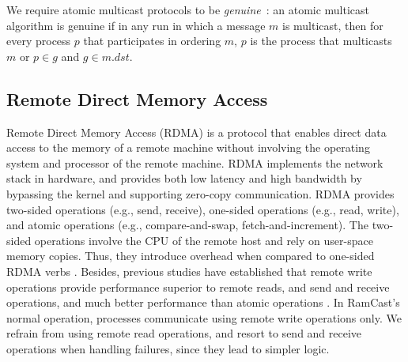 We require atomic multicast protocols to be \emph{genuine}~\cite{GS01b}: 
an atomic multicast algorithm is genuine if in any run in which a message $m$ is 
multicast, then for every process $p$ that participates in ordering $m$, $p$ is the process that multicasts $m$ or $p \in g$ and $g \in m.dst$.

\subsection{Remote Direct Memory Access}
\label{sec:rdma}

Remote Direct Memory Access (RDMA) is a protocol that enables direct data access to the memory of a remote machine without involving the operating system and processor of the remote machine. 
RDMA implements the network stack in hardware, and provides both low latency and high bandwidth by bypassing the kernel and supporting zero-copy communication.
RDMA provides two-sided operations (e.g., send, receive), one-sided operations (e.g., read, write), and atomic operations (e.g., compare-and-swap, fetch-and-increment). The two-sided operations involve the CPU of the remote host and rely on user-space memory copies.
Thus, they introduce overhead when compared to one-sided RDMA verbs \cite{FaRM}.
Besides, previous studies have established that remote write operations provide performance superior to remote reads, and send and receive operations, and much better performance than atomic operations \cite{kalia2014using, kalia2016design, mitchell2013using}.
In RamCast's normal operation, processes communicate using remote write operations only.
We refrain from using remote read operations, and resort to send and receive operations when handling failures, since they lead to simpler logic.

